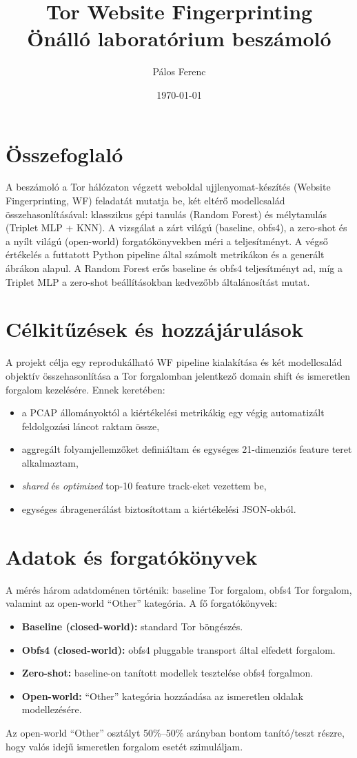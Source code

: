 \documentclass[a4paper,12pt]{article}
\title{\textbf{Tor Website Fingerprinting\\Önálló laboratórium beszámoló}}
\author{Pálos Ferenc}
\date{\today}
\begin{document}
\maketitle

\section*{Összefoglaló}
A beszámoló a Tor hálózaton végzett weboldal ujjlenyomat-készítés (Website Fingerprinting, WF)
feladatát mutatja be, két eltérő modellcsalád összehasonlításával: klasszikus gépi tanulás
(Random Forest) és mélytanulás (Triplet MLP + KNN). A vizsgálat a zárt világú
(baseline, obfs4), a zero-shot és a nyílt világú (open-world) forgatókönyvekben méri a
teljesítményt. A végső értékelés a futtatott Python pipeline által számolt metrikákon és a
generált ábrákon alapul. A Random Forest erős baseline és obfs4 teljesítményt ad, míg a
Triplet MLP a zero-shot beállításokban kedvezőbb általánosítást mutat.

\section{Célkitűzések és hozzájárulások}
A projekt célja egy reprodukálható WF pipeline kialakítása és két modellcsalád objektív
összehasonlítása a Tor forgalomban jelentkező domain shift és ismeretlen forgalom kezelésére.
Ennek keretében:
\begin{itemize}
    \item a PCAP állományoktól a kiértékelési metrikákig egy végig automatizált feldolgozási láncot raktam össze,
    \item aggregált folyamjellemzőket definiáltam és egységes 21-dimenziós feature teret alkalmaztam,
    \item \textit{shared} és \textit{optimized} top-10 feature track-eket vezettem be,
    \item egységes ábragenerálást biztosítottam a kiértékelési JSON-okból.
\end{itemize}

\section{Adatok és forgatókönyvek}
A mérés három adatdoménen történik: baseline Tor forgalom, obfs4 Tor forgalom, valamint
az open-world ``Other'' kategória. A fő forgatókönyvek:
\begin{itemize}
    \item \textbf{Baseline (closed-world):} standard Tor böngészés.
    \item \textbf{Obfs4 (closed-world):} obfs4 pluggable transport által elfedett forgalom.
    \item \textbf{Zero-shot:} baseline-on tanított modellek tesztelése obfs4 forgalmon.
    \item \textbf{Open-world:} ``Other'' kategória hozzáadása az ismeretlen oldalak modellezésére.
\end{itemize}
Az open-world ``Other'' osztályt 50\%--50\% arányban bontom tanító/teszt részre, hogy
valós idejű ismeretlen forgalom esetét szimuláljam.
\end{document}
